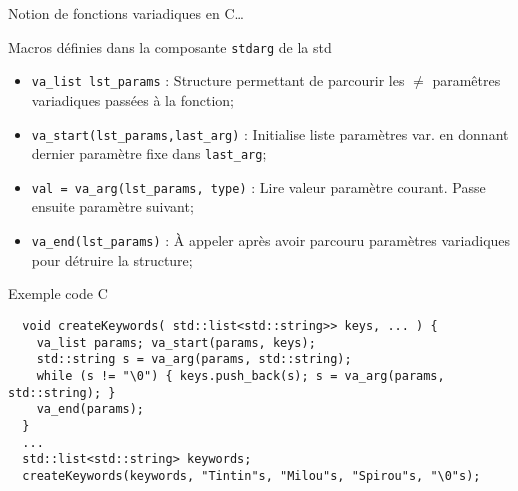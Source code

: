 \documentclass[compress,10pt,aspectratio=169]{beamer}
\begin{document}
  \begin{frame}[fragile]{Notion de fonctions variadiques en C\ldots}
  \scriptsize\vspace*{-3mm}
  
  \begin{block}{\small Macros définies dans la composante \texttt{stdarg} de la std}
  \begin{itemize}
  \item \texttt{va\_list lst\_params} : Structure permettant de parcourir les $\neq$ 
        paramêtres variadiques passées à la fonction;
  \item \texttt{va\_start(lst\_params,last\_arg)} : Initialise liste paramètres
        var. en donnant dernier paramètre fixe dans \texttt{last\_arg};
  \item \texttt{val = va\_arg(lst\_params, type)} : Lire valeur paramètre courant. Passe ensuite paramètre suivant;
  \item \texttt{va\_end(lst\_params)} : À appeler après avoir parcouru paramètres variadiques pour détruire la structure;
  \end{itemize}
  \end{block}
  \begin{exampleblock}{\small Exemple code C}
  \begin{verbatim}
  void createKeywords( std::list<std::string>> keys, ... ) {
    va_list params; va_start(params, keys);
    std::string s = va_arg(params, std::string);
    while (s != "\0") { keys.push_back(s); s = va_arg(params, std::string); }
    va_end(params);
  }
  ... 
  std::list<std::string> keywords;
  createKeywords(keywords, "Tintin"s, "Milou"s, "Spirou"s, "\0"s);
  \end{verbatim}
  \end{exampleblock}
  \end{frame}  
  
\end{document}
